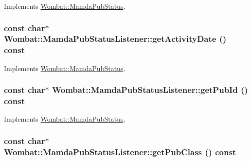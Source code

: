 Implements \hyperlink{classWombat_1_1MamdaPubStatus_fe58ce33fc151a3cd9d64f82e27a2058}{Wombat::Mamda\-Pub\-Status}.\hypertarget{classWombat_1_1MamdaPubStatusListener_0b14cc9aec4ec454b0095cf4f82fab5e}{
\subsubsection[getActivityDate]{\setlength{\rightskip}{0pt plus 5cm}const char$\ast$ Wombat::Mamda\-Pub\-Status\-Listener::get\-Activity\-Date () const}}
\label{classWombat_1_1MamdaPubStatusListener_0b14cc9aec4ec454b0095cf4f82fab5e}




Implements \hyperlink{classWombat_1_1MamdaPubStatus_2d1131459438c3e833583d0233c1c102}{Wombat::Mamda\-Pub\-Status}.\hypertarget{classWombat_1_1MamdaPubStatusListener_48e9eaf72c6faf1bab703c5993c1adf7}{
\subsubsection[getPubId]{\setlength{\rightskip}{0pt plus 5cm}const char$\ast$ Wombat::Mamda\-Pub\-Status\-Listener::get\-Pub\-Id () const}}
\label{classWombat_1_1MamdaPubStatusListener_48e9eaf72c6faf1bab703c5993c1adf7}




Implements \hyperlink{classWombat_1_1MamdaPubStatus_31447dec5db0e9837e8816a03cba88e4}{Wombat::Mamda\-Pub\-Status}.\hypertarget{classWombat_1_1MamdaPubStatusListener_838ffb83c7d46bf52b743f659dd733d9}{
\subsubsection[getPubClass]{\setlength{\rightskip}{0pt plus 5cm}const char$\ast$ Wombat::Mamda\-Pub\-Status\-Listener::get\-Pub\-Class () const}}
\label{classWombat_1_1MamdaPubStatusListener_838ffb83c7d46bf52b743f659dd733d9}




